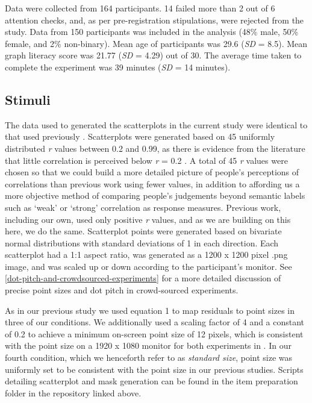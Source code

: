 \documentclass{vgtc}                          %
\begin{document}
Data were collected from 164 participants. 14 failed more than 2 out of 6 attention
checks, and, as per pre-registration stipulations, were rejected from the study. Data
from 150 participants was included in the analysis (48\% male, 50\% female, and 2\% non-binary). Mean age of participants was 29.6 (\emph{SD} = 8.5). Mean graph literacy score was 21.77
(\emph{SD} = 4.29) out of 30. The average time taken to complete
the experiment was 39 minutes (\emph{SD} = 14 minutes).

\hypertarget{stimuli}{%
\subsection{Stimuli}\label{stimuli}}

The data used to generated the scatterplots in the current study were identical to that
used previously \cite{strain_2023}. Scatterplots were generated based on 45 uniformly
distributed \emph{r} values between 0.2 and 0.99, as there is evidence from the literature
that little correlation is perceived below \emph{r} = 0.2 \cite{strahan_1978, bobko_1979, cleveland_1982}.
A total of 45 \emph{r} values were chosen so that we could build a more detailed picture
of people's perceptions of correlations than previous work using fewer values,
in addition to affording us a more objective method of comparing people's judgements
beyond semantic labels such as `weak' or `strong' correlation as response measures.
Previous work, including our own, used only positive \emph{r} values, and as we are building on this
here, we do the same. Scatterplot points were generated based on bivariate normal distributions with
standard deviations of 1 in each direction. Each scatterplot had a 1:1 aspect ratio,
was generated as a 1200 x 1200 pixel .png image, and was
scaled up or down according to the participant's monitor. See
\autoref{dot-pitch-and-crowdsourced-experiments} for a more detailed discussion of
precise point sizes and dot pitch in crowd-sourced experiments.

As in our previous study \cite{strain_2023} we used equation 1 to map residuals
to point sizes in three of our conditions. We additionally used a scaling factor
of 4 and a constant of 0.2 to achieve a minimum on-screen point size of 12 pixels,
which is consistent with the point size on a 1920 x 1080 monitor for both experiments
in \cite{strain_2023}. In our fourth condition, which we henceforth refer to as \emph{standard size},
point size was uniformly set to be consistent with the point size in our previous
studies. Scripts detailing scatterplot and mask generation can be found in the item
preparation folder in the repository linked above.
\end{document}
